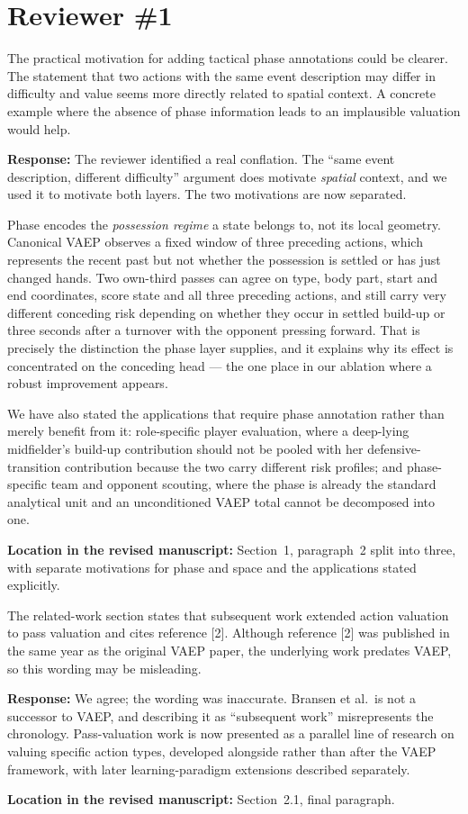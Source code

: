 \documentclass[11pt,a4paper]{article}
\newcommand{\response}[2]{%
  \begin{responsebox}
  \textbf{Response:}
  #1
  \end{responsebox}
  \begin{locationbox}
  \textbf{Location in the revised manuscript:}
  #2
  \end{locationbox}
}
\begin{document}
\clearpage
\section{Reviewer \#1}

\begin{reviewbox}
The practical motivation for adding tactical phase annotations could be clearer. The statement that two actions with the same event description may differ in difficulty and value seems more directly related to spatial context. A concrete example where the absence of phase information leads to an implausible valuation would help.
\end{reviewbox}
\response{The reviewer identified a real conflation. The ``same event description, different difficulty'' argument does motivate \emph{spatial} context, and we used it to motivate both layers. The two motivations are now separated.

Phase encodes the \emph{possession regime} a state belongs to, not its local geometry. Canonical VAEP observes a fixed window of three preceding actions, which represents the recent past but not whether the possession is settled or has just changed hands. Two own-third passes can agree on type, body part, start and end coordinates, score state and all three preceding actions, and still carry very different conceding risk depending on whether they occur in settled build-up or three seconds after a turnover with the opponent pressing forward. That is precisely the distinction the phase layer supplies, and it explains why its effect is concentrated on the conceding head --- the one place in our ablation where a robust improvement appears.

We have also stated the applications that require phase annotation rather than merely benefit from it: role-specific player evaluation, where a deep-lying midfielder's build-up contribution should not be pooled with her defensive-transition contribution because the two carry different risk profiles; and phase-specific team and opponent scouting, where the phase is already the standard analytical unit and an unconditioned VAEP total cannot be decomposed into one.}{Section~1, paragraph~2 split into three, with separate motivations for phase and space and the applications stated explicitly.}

\begin{reviewbox}
The related-work section states that subsequent work extended action valuation to pass valuation and cites reference [2]. Although reference [2] was published in the same year as the original VAEP paper, the underlying work predates VAEP, so this wording may be misleading.
\end{reviewbox}
\response{We agree; the wording was inaccurate. Bransen et al.\ is not a successor to VAEP, and describing it as ``subsequent work'' misrepresents the chronology. Pass-valuation work is now presented as a parallel line of research on valuing specific action types, developed alongside rather than after the VAEP framework, with later learning-paradigm extensions described separately.}{Section~2.1, final paragraph.}
\end{document}
